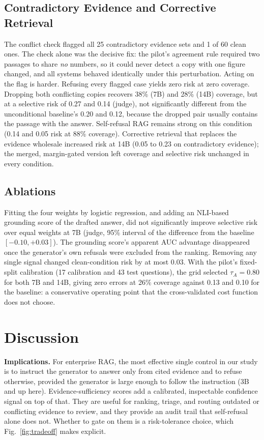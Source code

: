 \documentclass[conference,letterpaper]{IEEEtran}
\newcommand{\tA}{\tau_A}
\begin{document}
\subsection{Contradictory Evidence and Corrective Retrieval}
The conflict check flagged all 25 contradictory evidence sets and 1 of 60 clean ones. The
check alone was the decisive fix: the pilot's agreement rule required two passages to share
\emph{no} numbers, so it could never detect a copy with one figure changed, and all systems
behaved identically under this perturbation. Acting on the flag is harder. Refusing every
flagged case yields zero risk at zero coverage. Dropping both conflicting copies recovers 38\% (7B)
and 28\% (14B) coverage, but at a selective risk of 0.27 and 0.14 (judge), not significantly
different from the unconditional baseline's 0.20 and 0.12, because the dropped pair usually
contains the passage with the answer. Self-refusal RAG remains strong on this condition (0.14 and
0.05 risk at 88\% coverage). Corrective retrieval that replaces the evidence wholesale increased
risk at 14B (0.05 to 0.23 on contradictory evidence); the merged, margin-gated version left coverage and
selective risk unchanged in every condition.

\subsection{Ablations}\label{sec:ablation}
Fitting the four weights by logistic regression, and adding an NLI-based grounding score of the
drafted answer, did not significantly improve selective risk over equal weights at 7B (judge,
95\% interval of the difference from the baseline $[-0.10,+0.03]$). The grounding score's
apparent AUC advantage disappeared once the generator's own refusals were excluded from the
ranking. Removing any single signal changed clean-condition risk by at most 0.03. With the
pilot's fixed-split calibration (17 calibration and 43 test questions), the grid selected
$\tA=0.80$ for both 7B and 14B, giving zero errors at 26\% coverage against 0.13 and 0.10 for the
baseline: a conservative operating point that the cross-validated cost function does not choose.

\section{Discussion}
\textbf{Implications.} For enterprise RAG, the most effective single control in our study is to
instruct the generator to answer only from cited evidence and to refuse otherwise, provided the
generator is large enough to follow the instruction (3B and up here). Evidence-sufficiency scores
add a calibrated, inspectable confidence signal on top of that. They are useful for ranking,
triage, and routing outdated or conflicting evidence to review, and they provide an audit trail
that self-refusal alone does not. Whether to gate on them is a risk-tolerance choice, which
Fig.~\ref{fig:tradeoff} makes explicit.
\end{document}

